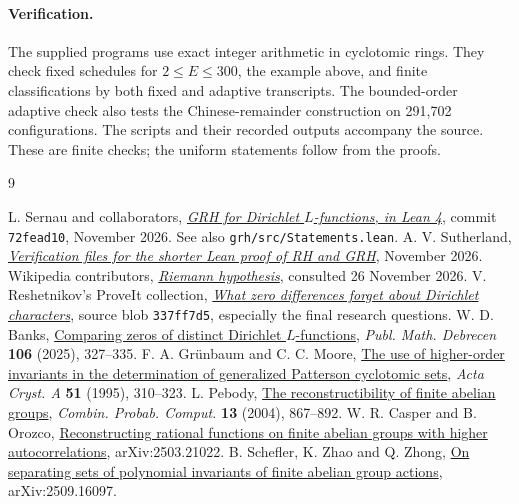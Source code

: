 \documentclass[11pt,letterpaper]{article}
\begin{document}
\paragraph{Verification.}
The supplied programs use exact integer arithmetic in cyclotomic rings. They check fixed schedules for $2\le E\le300$, the example above, and finite classifications by both fixed and adaptive transcripts. The bounded-order adaptive check also tests the Chinese-remainder construction on 291,702 configurations. The scripts and their recorded outputs accompany the source. These are finite checks; the uniform statements follow from the proofs.
\begin{thebibliography}{9}\small\raggedright\setlength{\itemsep}{1pt}
 L. Sernau and collaborators, \href{https://github.com/lsernau/grh-lean/blob/72fead102f663d5c7a407964a13dc0cf9d977207/grh/src/Main.lean}{\emph{GRH for Dirichlet $L$-functions, in Lean 4}}, commit \texttt{72fead10}, November 2026. See also \texttt{grh/src/Statements.lean}.
 A. V. Sutherland, \href{https://math.mit.edu/~drew/shortgrh/}{\emph{Verification files for the shorter Lean proof of RH and GRH}}, November 2026.
 Wikipedia contributors, \href{https://en.wikipedia.org/wiki/Riemann_hypothesis}{\emph{Riemann hypothesis}}, consulted 26 November 2026.
 V. Reshetnikov's ProveIt collection, \href{https://github.com/VladimirReshetnikov/ProveIt/blob/b29490a150d3947b114d6c9daf3398300537eb64/Analysis/GeneralizedRiemannHypothesis/Research/dirichlet_zero_packet_homometry/zero_packets.tex}{\emph{What zero differences forget about Dirichlet characters}}, source blob \texttt{337ff7d5}, especially the final research questions.
 W. D. Banks, \href{https://arxiv.org/abs/2302.07073}{Comparing zeros of distinct Dirichlet $L$-functions}, \emph{Publ. Math. Debrecen} \textbf{106} (2025), 327--335.
 F. A. Gr\"unbaum and C. C. Moore, \href{https://doi.org/10.1107/S0108767394009827}{The use of higher-order invariants in the determination of generalized Patterson cyclotomic sets}, \emph{Acta Cryst. A} \textbf{51} (1995), 310--323.
 L. Pebody, \href{https://doi.org/10.1017/S0963548303005807}{The reconstructibility of finite abelian groups}, \emph{Combin. Probab. Comput.} \textbf{13} (2004), 867--892.
 W. R. Casper and B. Orozco, \href{https://arxiv.org/abs/2503.21022}{Reconstructing rational functions on finite abelian groups with higher autocorrelations}, arXiv:2503.21022.
 B. Schefler, K. Zhao and Q. Zhong, \href{https://arxiv.org/abs/2509.16097}{On separating sets of polynomial invariants of finite abelian group actions}, arXiv:2509.16097.
\end{thebibliography}
\end{document}
